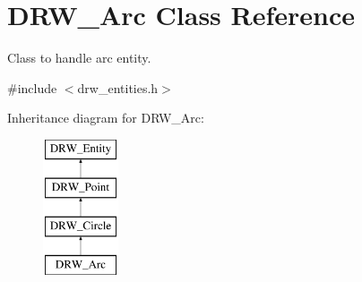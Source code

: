 \hypertarget{class_d_r_w___arc}{}\section{D\+R\+W\+\_\+\+Arc Class Reference}
\label{class_d_r_w___arc}


Class to handle arc entity.  




{\ttfamily \#include $<$drw\+\_\+entities.\+h$>$}

Inheritance diagram for D\+R\+W\+\_\+\+Arc\+:\begin{figure}[H]
\begin{center}
\leavevmode
\includegraphics[height=4.000000cm]{d1/ddc/class_d_r_w___arc}
\end{center}
\end{figure}
